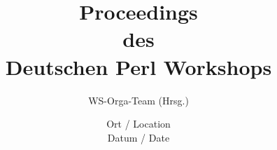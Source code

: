 \documentclass[11pt,a4paper,twoside,headsepline]{scrartcl}
\begin{document}
\title{Proceedings \\ des \\ Deutschen Perl Workshops}
\author{WS-Orga-Team (Hrsg.)}
\date{Ort / Location \\ Datum / Date}
\maketitle
\tableofcontents


\newpage



\printindex
\end{document}
